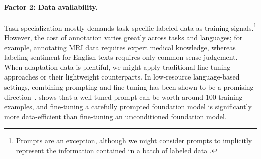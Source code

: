 \noindent\paragraph{Factor 2: Data availability.} Task specialization mostly demands task-specific labeled data as training signals.\footnote{Prompts are an exception, although we might consider prompts to implicitly represent the information contained in a batch of labeled data \cite{le-scao-rush-2021-many}.} However, the cost of annotation varies greatly across tasks and languages; for example, annotating MRI data requires expert medical knowledge, whereas labeling sentiment for English texts requires only common sense judgement.
When adaptation data is plentiful, we might apply traditional fine-tuning approaches or their lightweight counterparts.
In low-resource language-based settings, combining prompting and fine-tuning has been shown to be a promising direction~\citep{schick-schutze-2021-exploiting, schick-schutze-2021-just,gao2020fewshot,perez2021true,logan-cutting-2021,min2021noisy}. \citet{le-scao-rush-2021-many} shows that a well-tuned prompt can be worth around 100 training examples, and fine-tuning a carefully prompted foundation model is significantly more data-efficient than fine-tuning an unconditioned foundation model. 


